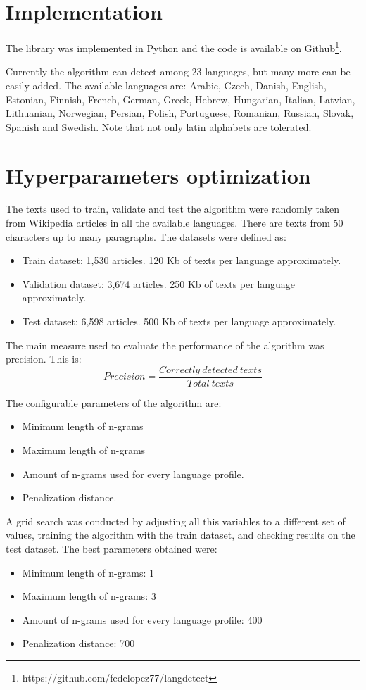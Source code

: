\documentclass{llncs}
\begin{document}
\section{Implementation}
The library was implemented in Python and the code is available on Github\footnote{https://github.com/fedelopez77/langdetect}.

Currently the algorithm can detect among 23 languages, but many more can be easily added. The available languages are: Arabic, Czech, Danish, English, Estonian, Finnish, French, German, Greek, Hebrew, Hungarian, Italian, Latvian, Lithuanian, Norwegian, Persian, Polish, Portuguese, Romanian, Russian, Slovak, Spanish and Swedish. 
Note that not only latin alphabets are tolerated.


\section{Hyperparameters optimization}
The texts used to train, validate and test the algorithm were randomly taken from Wikipedia articles in all the available languages. There are texts from 50 characters up to many paragraphs. The datasets were defined as: 
\begin{itemize}
	\item Train dataset: 1,530 articles. 120 Kb of texts per language approximately.
	\item Validation dataset: 3,674 articles. 250 Kb of texts per language approximately.
	\item Test dataset: 6,598 articles. 500 Kb of texts per language approximately.
\end{itemize}

The main measure used to evaluate the performance of the algorithm was precision. This is:
\begin{equation}
Precision = \frac{Correctly\:detected\:texts}
{Total\:texts}
\end{equation}

The configurable parameters of the algorithm are:
\begin{itemize}
	\item Minimum length of n-grams
	\item Maximum length of n-grams
	\item Amount of n-grams used for every language profile.
	\item Penalization distance.
\end{itemize}

A grid search was conducted by adjusting all this variables to a different set of values, training the algorithm with the train dataset, and checking results on the test dataset. The best parameters obtained were:
\begin{itemize}
	\item Minimum length of n-grams: 1
	\item Maximum length of n-grams: 3
	\item Amount of n-grams used for every language profile: 400
	\item Penalization distance: 700
\end{itemize}
\end{document}
